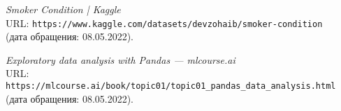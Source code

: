 \begin{thebibliography}{99}
{\itshape Smoker Condition | Kaggle}\\
URL: \texttt{https://www.kaggle.com/datasets/devzohaib/smoker-condition}\\
(дата обращения: 08.05.2022).

{\itshape Exploratory data analysis with Pandas --- mlcourse.ai}\\
URL: \texttt{https://mlcourse.ai/book/topic01/topic01\_pandas\_data\_analysis.html}\\
(дата обращения: 08.05.2022).

\end{thebibliography}
\pagebreak
